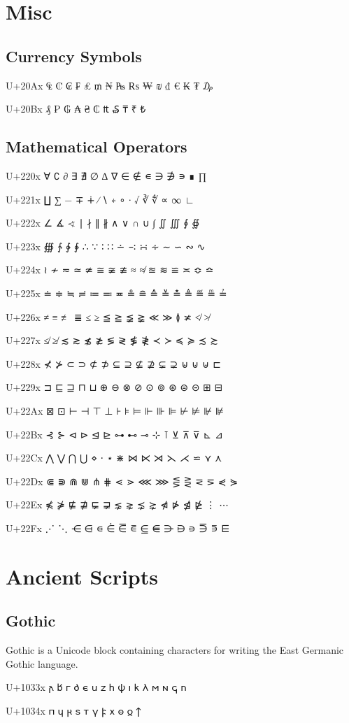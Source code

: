 \section{Misc}
\subsection{Currency Symbols}

U+20Ax 	₠ 	₡ 	₢ 	₣ 	₤ 	₥ 	₦ 	₧ 	₨ 	₩ 	₪ 	₫ 	€ 	₭ 	₮ 	₯

U+20Bx 	₰ 	₱ 	₲ 	₳ 	₴ 	₵ 	₶ 	₷ 	₸ 	₹ 	₺

\subsection{Mathematical Operators}
U+220x 	∀ 	∁ 	∂ 	∃ 	∄ 	∅ 	∆ 	∇ 	∈ 	∉ 	∊ 	∋ 	∌ 	∍ 	∎ 	∏

U+221x 	∐ 	∑ 	− 	∓ 	∔ 	∕ 	∖ 	∗ 	∘ 	∙ 	√ 	∛ 	∜ 	∝ 	∞ 	∟

U+222x 	∠ 	∡ 	∢ 	∣ 	∤ 	∥ 	∦ 	∧ 	∨ 	∩ 	∪ 	∫ 	∬ 	∭ 	∮ 	∯

U+223x 	∰ 	∱ 	∲ 	∳ 	∴ 	∵ 	∶ 	∷ 	∸ 	∹ 	∺ 	∻ 	∼ 	∽ 	∾ 	∿

U+224x 	≀ 	≁ 	≂ 	≃ 	≄ 	≅ 	≆ 	≇ 	≈ 	≉ 	≊ 	≋ 	≌ 	≍ 	≎ 	≏

U+225x 	≐ 	≑ 	≒ 	≓ 	≔ 	≕ 	≖ 	≗ 	≘ 	≙ 	≚ 	≛ 	≜ 	≝ 	≞ 	≟

U+226x 	≠ 	≡ 	≢ 	≣ 	≤ 	≥ 	≦ 	≧ 	≨ 	≩ 	≪ 	≫ 	≬ 	≭ 	≮ 	≯

U+227x 	≰ 	≱ 	≲ 	≳ 	≴ 	≵ 	≶ 	≷ 	≸ 	≹ 	≺ 	≻ 	≼ 	≽ 	≾ 	≿

U+228x 	⊀ 	⊁ 	⊂ 	⊃ 	⊄ 	⊅ 	⊆ 	⊇ 	⊈ 	⊉ 	⊊ 	⊋ 	⊌ 	⊍ 	⊎ 	⊏

U+229x 	⊐ 	⊑ 	⊒ 	⊓ 	⊔ 	⊕ 	⊖ 	⊗ 	⊘ 	⊙ 	⊚ 	⊛ 	⊜ 	⊝ 	⊞ 	⊟

U+22Ax 	⊠ 	⊡ 	⊢ 	⊣ 	⊤ 	⊥ 	⊦ 	⊧ 	⊨ 	⊩ 	⊪ 	⊫ 	⊬ 	⊭ 	⊮ 	⊯

U+22Bx 	⊰ 	⊱ 	⊲ 	⊳ 	⊴ 	⊵ 	⊶ 	⊷ 	⊸ 	⊹ 	⊺ 	⊻ 	⊼ 	⊽ 	⊾ 	⊿

U+22Cx 	⋀ 	⋁ 	⋂ 	⋃ 	⋄ 	⋅ 	⋆ 	⋇ 	⋈ 	⋉ 	⋊ 	⋋ 	⋌ 	⋍ 	⋎ 	⋏

U+22Dx 	⋐ 	⋑ 	⋒ 	⋓ 	⋔ 	⋕ 	⋖ 	⋗ 	⋘ 	⋙ 	⋚ 	⋛ 	⋜ 	⋝ 	⋞ 	⋟

U+22Ex 	⋠ 	⋡ 	⋢ 	⋣ 	⋤ 	⋥ 	⋦ 	⋧ 	⋨ 	⋩ 	⋪ 	⋫ 	⋬ 	⋭ 	⋮ 	⋯

U+22Fx 	⋰ 	⋱ 	⋲ 	⋳ 	⋴ 	⋵ 	⋶ 	⋷ 	⋸ 	⋹ 	⋺ 	⋻ 	⋼ 	⋽ 	⋾ 	⋿

\section{Ancient Scripts}
\subsection{Gothic}
Gothic is a Unicode block containing characters for writing the East Germanic Gothic language.

U+1033x 	𐌰 	𐌱 	𐌲 	𐌳 	𐌴 	𐌵 	𐌶 	𐌷 	𐌸 	𐌹 	𐌺 	𐌻 	𐌼 	𐌽 	𐌾 	𐌿

U+1034x 	𐍀 	𐍁 	𐍂 	𐍃 	𐍄 	𐍅 	𐍆 	𐍇 	𐍈 	𐍉 	𐍊
